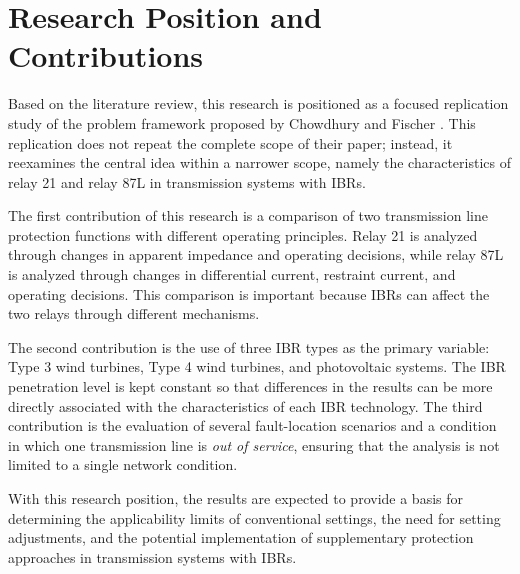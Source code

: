 \section{Research Position and Contributions}

Based on the literature review, this research is positioned as a focused replication study of the problem framework proposed by Chowdhury and Fischer \cite{chowdhury2021tlp1}. This replication does not repeat the complete scope of their paper; instead, it reexamines the central idea within a narrower scope, namely the characteristics of relay 21 and relay 87L in transmission systems with IBRs.

The first contribution of this research is a comparison of two transmission line protection functions with different operating principles. Relay 21 is analyzed through changes in apparent impedance and operating decisions, while relay 87L is analyzed through changes in differential current, restraint current, and operating decisions. This comparison is important because IBRs can affect the two relays through different mechanisms.

The second contribution is the use of three IBR types as the primary variable: Type 3 wind turbines, Type 4 wind turbines, and photovoltaic systems. The IBR penetration level is kept constant so that differences in the results can be more directly associated with the characteristics of each IBR technology. The third contribution is the evaluation of several fault-location scenarios and a condition in which one transmission line is \textit{out of service}, ensuring that the analysis is not limited to a single network condition.

With this research position, the results are expected to provide a basis for determining the applicability limits of conventional settings, the need for setting adjustments, and the potential implementation of supplementary protection approaches in transmission systems with IBRs.
